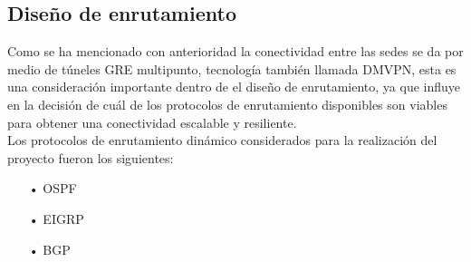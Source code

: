 \subsection{Diseño de enrutamiento}
\label{sec:Diseño de enrutamiento}

Como se ha mencionado con anterioridad la conectividad entre las sedes se da por medio de túneles GRE multipunto, tecnología también llamada DMVPN, esta es una consideración importante dentro de el diseño de enrutamiento, ya que influye en la decisión de cuál de los protocolos de enrutamiento disponibles son viables para obtener una conectividad escalable y resiliente.
\\
Los protocolos de enrutamiento dinámico considerados para la realización del proyecto fueron los siguientes:

\begin{itemize}
\item[•]OSPF
\item[•]EIGRP
\item[•]BGP
\end{itemize}

